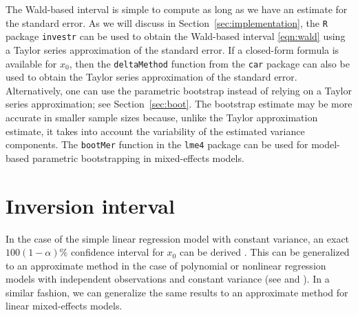 \documentclass{article}\usepackage[]{graphicx}\usepackage[]{color}
\begin{document}
The Wald-based interval is simple to compute as long as we have an estimate for the standard error. As we will discuss in Section~\ref{sec:implementation}, the \texttt{R} package \texttt{investr} \citep{investr-package} can be used to obtain the Wald-based interval \eqref{eqn:wald} using a Taylor series approximation of the standard error. If a closed-form formula is available for $\widehat{x}_0$, then the \texttt{deltaMethod} function from the \texttt{car} package \citep{fox-car-2011} can also be used to obtain the Taylor series approximation of the standard error. Alternatively, one can use the parametric bootstrap instead of relying on a Taylor series approximation; see Section~\ref{sec:boot}. The bootstrap estimate may be more accurate in smaller sample sizes because, unlike the Taylor approximation estimate, it takes into account the variability of the estimated variance components. The \texttt{bootMer} function in the \texttt{lme4} package \citep{bates-lme4-2014} can be used for model-based parametric bootstrapping in mixed-effects models.



\section{Inversion interval}\label{sec:inversion}

In the case of the simple linear regression model with constant variance, an exact $100(1-\alpha)\%$ confidence interval for $x_0$ can be derived \citep{graybill-theory-1976}.  This can be generalized to an approximate method in the case of polynomial or nonlinear regression models with independent observations and constant variance (see \citet{seber-nonlinear-2003} and \citet{huet-statistical-2004}).  In a similar fashion, we can generalize the same results to an approximate method for linear mixed-effects models.  
\end{document}
